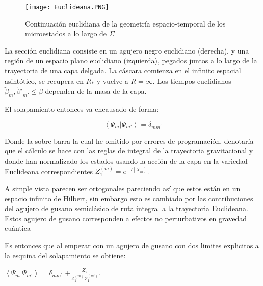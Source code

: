 \documentclass[letterpaper]{article}
\begin{document}
\begin{justify}
\begin{figure}[h]
    \centering
    \texttt{[image: Euclideana.PNG]}
    \caption{Continuación euclidiana de la geometría espacio-temporal de los microestados a lo largo de \(\Sigma\) }   
\end{figure}
\end{justify}
\begin{justify}
La sección euclidiana consiste en un agujero negro euclidiano (derecha), y una región de un espacio plano euclidiano (izquierda), pegados juntos a lo largo de la trayectoria de una capa delgada. La cáscara comienza en el infinito espacial asintótico,
se recupera en \(R_*\) y vuelve a \(R= \infty\). Los tiempos euclidianos \(\tilde{\beta}_m , \tilde{\beta '}_{m'} \leq \beta\) dependen de la masa de la capa.
\end{justify}
\begin{justify}
El solapamiento entonces va encausado de forma:

\[\left< \Psi_{m}|\Psi_{m'} \right>= \delta_{mm^'} \]
\end{justify}
\begin{justify}
Donde la sobre barra la cual he omitido por errores de programación, denotaría  que el cálculo se hace con las reglas de integral de la trayectoria gravitacional y donde han normalizado
los estados usando la acción de la capa en la variedad Euclideana correspondientes \(Z^{(m)}_1 = e^{-I[X_m]}\).
\end{justify}
\begin{justify}
A simple vista parecen ser ortogonales  pareciendo así que estos están en un espacio infinito de Hilbert, sin embargo esto es cambiado por las contribuciones
del agujero de gusano semiclásico de ruta integral a la trayectoria Euclideana. Estos agujero de gusano corresponden a efectos no perturbativos en gravedad cuántica
\end{justify}
\begin{justify}
Es entonces que al empezar con un agujero de gusano con dos limites explicitos a la esquina del solapamiento se obtiene:
\vspace{\baselineskip}
\vspace{\baselineskip}

\; \; \; \; \; \; \; \; \; \; \; \; \; \(\left< \Psi_{m}|\Psi_{m'} \right>= \delta_{mm^'}\) \( + \frac{Z_2}{Z_1^{(m)}Z_1^{(m')}} \).
\end{justify}
\vspace{\baselineskip}
\end{document}
